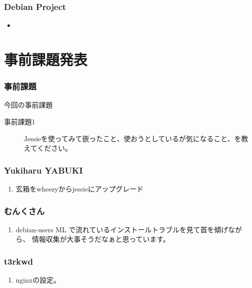 \documentclass[cjk,dvipdfmx,10pt,compress,%
hyperref={bookmarks=true,bookmarksnumbered=true,bookmarksopen=false,%
colorlinks=false,%
pdftitle={第 98 回 関西 Debian 勉強会},%
pdfauthor={倉敷・のがた・佐々木・かわだ},%
pdfsubject={資料},%
}]{beamer}
\begin{document}
\begin{frame}[fragile]
  \frametitle{Debian Project}
  \begin{itemize}
  \item 
  \end{itemize}
\end{frame}


\section{事前課題発表}


\begin{frame}[fragile]
  \frametitle{事前課題}
  \begin{block}{今回の事前課題}
    \begin{description}
    \item[事前課題1]
      Jessieを使ってみて嵌ったこと、使おうとしているが気になること、を教えてください。
    \end{description}
  \end{block}
\end{frame}


\begin{frame}
  \frametitle{ Yukiharu YABUKI }
  \begin{enumerate}
  \item 玄箱をwheezyからjessieにアップグレード
  \end{enumerate}
\end{frame}

\begin{frame}
  \frametitle{ むんくさん }
  \begin{enumerate}
  \item  debian-users ML で流れているインストールトラブルを見て首を傾げながら、
    情報収集が大事そうだなぁと思っています。
  \end{enumerate}
\end{frame}

\begin{frame}
  \frametitle{ t3rkwd }
  \begin{enumerate}
  \item nginxの設定。
  \end{enumerate}
\end{frame}
\end{document}
